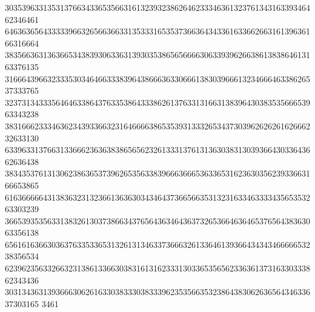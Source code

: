 30353963313531376634336535663161323932386264623334636132376134316339346462346461
64636365643333396632656636633135333165353736636434336163366266316139636166316664
38356636313636653438393063363139303538656566663063393962663861383864613163376135
31666439663233353034646633383964386663633066613830396661323466646338626537333765
32373134333564646338643763353864333862613763313166313839643038353566653963343238
38316662333463623439336632316466663865353931333265343730396262626162666232633130
63396331376631336662363638386565623261333137613136303831303936643033643662636438
38343537613130623863653739626535633839666366653633653162363035623933663166653865
61636666643138363231323661363630343464373665663531323163346333343565353263303239
36653935356331383261303738663437656436346436373265366463646537656438363063356138
65616163663036376335336531326131346337366632613364613936643434346666653238356534
62396235633266323138613366303831613162333130336535656233636137316330333862343436
30313436313936663062616330383330383339623535663532386438306263656434633637303165
3461
